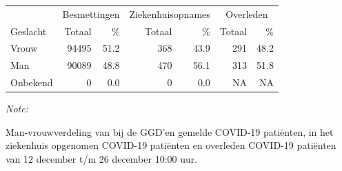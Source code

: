 \documentclass[
  english,
  man,floatsintext]{apa6}
\begin{document}
\begin{table}
\centering\begingroup\fontsize{11}{13}\selectfont

\begin{threeparttable}
\begin{tabular}{lrrrrrr}
\toprule
\multicolumn{1}{c}{ } & \multicolumn{2}{c}{Besmettingen} & \multicolumn{2}{c}{Ziekenhuisopnames} & \multicolumn{2}{c}{Overleden} \\
\cmidrule(l{3pt}r{3pt}){2-3} \cmidrule(l{3pt}r{3pt}){4-5} \cmidrule(l{3pt}r{3pt}){6-7}
Geslacht & Totaal & \% & Totaal & \% & Totaal & \%\\
\midrule
Vrouw & 94495 & 51.2 & 368 & 43.9 & 291 & 48.2\\
Man & 90089 & 48.8 & 470 & 56.1 & 313 & 51.8\\
Onbekend & 0 & 0.0 & 0 & 0.0 & NA & NA\\
\bottomrule
\end{tabular}
\begin{tablenotes}
\item \textit{Note: } 
\item Man-vrouwverdeling van bij de GGD’en gemelde COVID-19 patiënten, in het ziekenhuis opgenomen COVID-19 patiënten en overleden COVID-19 patiënten van 12 december t/m 26 december 10:00 uur.
\end{tablenotes}
\end{threeparttable}
\endgroup{}
\end{table}
\newpage
\end{document}
